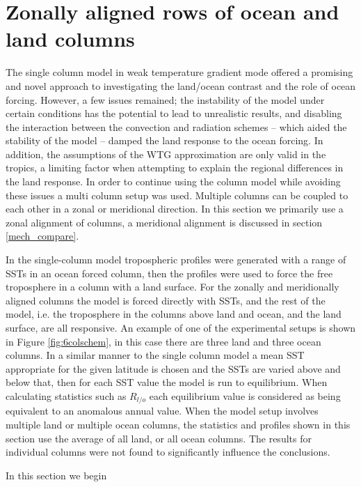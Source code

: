 \clearpage

\section{Zonally aligned rows of ocean and land columns}
\label{mech_mcm}

The single column model in weak temperature gradient mode offered a promising 
and novel approach to investigating the land/ocean contrast and the role of 
ocean forcing.  However, a few issues remained; the instability of the model 
under certain conditions has the potential to lead to unrealistic results, and 
disabling the interaction between the convection and radiation schemes -- which 
aided the stability of the model -- damped the land response to the ocean 
forcing.  In addition, the assumptions of the WTG approximation are only valid 
in the tropics, a limiting factor when attempting to explain the regional 
differences in the land response.  In order to continue using the column model 
while avoiding these issues a multi column setup was used. Multiple columns can 
be coupled to each other in a zonal or meridional direction. In this section we 
primarily use a zonal alignment of columns, a meridional alignment is discussed 
in section \ref{mech_compare}.

In the single-column model tropospheric profiles were generated with a range of 
SSTs in an ocean forced column, then the profiles were used to force the free 
troposphere in a column with a land surface. For the zonally and meridionally 
aligned columns the model is forced directly with SSTs, and the rest of the 
model, i.e. the troposphere in the columns above land and ocean, and the land 
surface, are all responsive. An example of one of the experimental setups is 
shown in Figure \ref{fig:6colschem}, in this case there are three land and three 
ocean columns. In a similar manner to the single column model a mean SST 
appropriate for the given latitude is chosen and the SSTs are varied above and 
below that, then for each SST value the model is run to equilibrium. When 
calculating statistics such as $R_{l/o}$ each equilibrium value is considered as 
being equivalent to an anomalous annual value. When the model setup involves 
multiple land or multiple ocean columns, the statistics and profiles shown in 
this section use the average of all land, or all ocean columns. The results for 
individual columns were not found to significantly influence the conclusions.

In this section we begin 

